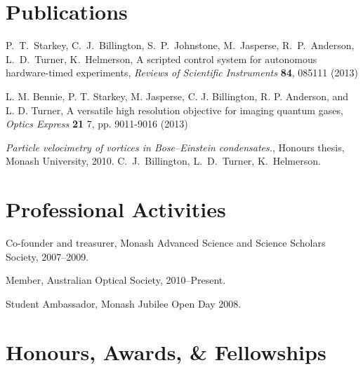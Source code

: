 \documentclass[10pt,letterpaper]{article}
\renewenvironment{itemize}{
  \begin{list}{}{
    \setlength{\leftmargin}{1.5em}
    \setlength{\itemsep}{0.25em}
    \setlength{\parskip}{0pt}
    \setlength{\parsep}{0.25em}
  }
}{
  \end{list}
}
\begin{document}
\section*{Publications}
\begin{itemize}
\item P.~T.~Starkey, C.~J.~Billington, S.~P.~Johnstone, M.~Jasperse, R.~P.~Anderson, L.~D.~Turner, K.~Helmerson, A scripted control system for autonomous hardware-timed experiments, \textit{Reviews of Scientific Instruments} {\bf 84}, 085111 (2013) 

\item L. M. Bennie, P. T. Starkey, M. Jasperse, C. J. Billington, R. P. Anderson, and L. D. Turner, A versatile high resolution objective for imaging quantum gases, \textit{Optics Express} {\bf 21} 7, pp. 9011-9016 (2013) 

\item \textit{Particle velocimetry of vortices in Bose--Einstein condensates.}, Honours thesis, Monash University, 2010.
C.~J.~Billington, L.~D.~Turner, K.~Helmerson.
    
\end{itemize}

\section*{Professional Activities}

\begin{itemize}
\item Co-founder and treasurer, Monash Advanced Science and Science Scholars Society, 2007--2009.
\item Member, Australian Optical Society, 2010--Present.
\item Student Ambassador, Monash Jubilee Open Day 2008.
\end{itemize}

\section*{Honours, Awards, \& Fellowships}
\end{document}
